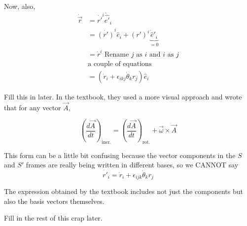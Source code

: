 \documentclass[11pt]{article}
\begin{document}
\vskip 0.5cm
Now, also, 
\begin{align*}
  \dot{\vec{r}} &= \dot{r'}^i \dot{\hat{e'}}_i \\
  &= \dot{(r')}^i \hat{e}_i + (r')^i \underbrace{\dot{\hat{e}}'_i}_{=0} \\
  &= \dot{r}^i  \text{ Rename $j$ as $i$ and $i$ as $j$}\\ 
  &\text{a couple of equations} \\
  &= \left( \dot{r}_i + \epsilon_{ikj} \dot{\theta}_k r_j\right)
 \hat{e}_i\end{align*}

Fill this in later.
\vskip 0.5cm
In the textbook, they used a more visual approach and wrote that for any vector $\vec{A}$,

\[ \left(\frac{d\vec{A}}{dt}\right)_{\text{iner.}} = \left(\frac{d\vec{A}}{dt}\right)_{\text{rot.}} + \vec{\omega} \times \vec{A}  \]

\vskip 0.5cm
This form can be a little bit confusing because the vector components in the $S$ and $S'$ frames are really being written in different bases, so we CANNOT say 
\[ \dot{r'}_i = \dot{r}_i + \epsilon_{ijk} \dot{\theta}_k r_j \]

\vskip 0.5cm
The expression obtained by the textbook includes not just the components but also the basis vectors themselves.

\vskip 0.5cm
Fill in the rest of this crap later. 
\end{document}
